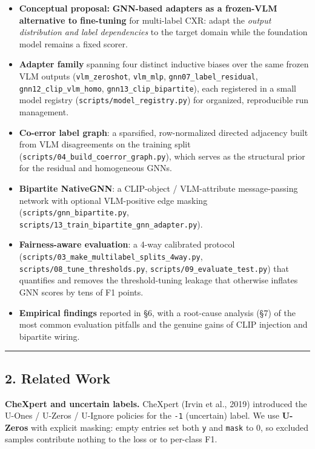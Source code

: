 \documentclass[
  11pt,
]{article}
\providecommand{\tightlist}{%
  \setlength{\itemsep}{0pt}\setlength{\parskip}{0pt}}
\begin{document}
\begin{itemize}
\tightlist
\item
  \textbf{Conceptual proposal:} \textbf{GNN-based adapters as a
  frozen-VLM alternative to fine-tuning} for multi-label CXR: adapt the
  \emph{output distribution and label dependencies} to the target domain
  while the foundation model remains a fixed scorer.
\item
  \textbf{Adapter family} spanning four distinct inductive biases over
  the same frozen VLM outputs (\texttt{vlm\_zeroshot},
  \texttt{vlm\_mlp}, \texttt{gnn07\_label\_residual},
  \texttt{gnn12\_clip\_vlm\_homo}, \texttt{gnn13\_clip\_bipartite}),
  each registered in a small model registry
  (\texttt{scripts/model\_registry.py}) for organized, reproducible run
  management.
\item
  \textbf{Co-error label graph}: a sparsified, row-normalized directed
  adjacency built from VLM disagreements on the training split
  (\texttt{scripts/04\_build\_coerror\_graph.py}), which serves as the
  structural prior for the residual and homogeneous GNNs.
\item
  \textbf{Bipartite NativeGNN}: a CLIP-object / VLM-attribute
  message-passing network with optional VLM-positive edge masking
  (\texttt{scripts/gnn\_bipartite.py},
  \texttt{scripts/13\_train\_bipartite\_gnn\_adapter.py}).
\item
  \textbf{Fairness-aware evaluation}: a 4-way calibrated protocol
  (\texttt{scripts/03\_make\_multilabel\_splits\_4way.py},
  \texttt{scripts/08\_tune\_thresholds.py},
  \texttt{scripts/09\_evaluate\_test.py}) that quantifies and removes
  the threshold-tuning leakage that otherwise inflates GNN scores by
  tens of F1 points.
\item
  \textbf{Empirical findings} reported in §6, with a root-cause analysis
  (§7) of the most common evaluation pitfalls and the genuine gains of
  CLIP injection and bipartite wiring.
\end{itemize}

\begin{center}\rule{0.5\linewidth}{0.5pt}\end{center}

\subsection{2. Related Work}\label{related-work}

\textbf{CheXpert and uncertain labels.} CheXpert (Irvin et al., 2019)
introduced the U-Ones / U-Zeros / U-Ignore policies for the \texttt{-1}
(uncertain) label. We use \textbf{U-Zeros} with explicit masking: empty
entries set both \texttt{y} and \texttt{mask} to 0, so excluded samples
contribute nothing to the loss or to per-class F1.
\end{document}
